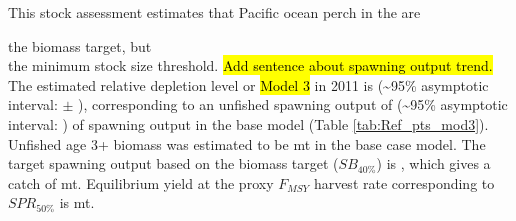\documentclass[12pt,]{article}
\begin{document}
This stock assessment estimates that Pacific ocean perch in the are

the biomass target, but\\
the minimum stock size threshold.
\hl{Add sentence about spawning output trend.} The estimated relative
depletion level or \hl{Model 3} in 2011 is (\textasciitilde{}95\%
asymptotic interval: \(\pm\) ), corresponding to an unfished spawning
output of (\textasciitilde{}95\% asymptotic interval: ) of spawning
output in the base model (Table \ref{tab:Ref_pts_mod3}). Unfished age 3+
biomass was estimated to be mt in the base case model. The target
spawning output based on the biomass target (\(SB_{40\%}\)) is , which
gives a catch of mt. Equilibrium yield at the proxy \(F_{MSY}\) harvest
rate corresponding to \(SPR_{50\%}\) is mt.

\FloatBarrier
\end{document}
